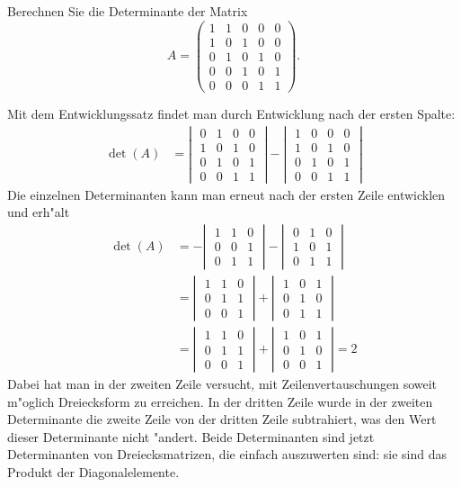 Berechnen Sie die Determinante der Matrix
\[
A=
\begin{pmatrix}
1&1&0&0&0\\
1&0&1&0&0\\
0&1&0&1&0\\
0&0&1&0&1\\
0&0&0&1&1
\end{pmatrix}.
\]

\begin{loesung}
Mit dem Entwicklungssatz findet man durch Entwicklung nach der
ersten Spalte:
\begin{align*}
\det(A)
&=
\left|\;
\begin{matrix}
0&1&0&0\\
1&0&1&0\\
0&1&0&1\\
0&0&1&1
\end{matrix}
\;\right|
-
\left|\;
\begin{matrix}
1&0&0&0\\
1&0&1&0\\
0&1&0&1\\
0&0&1&1
\end{matrix}
\;\right|
\end{align*}
Die einzelnen Determinanten kann man erneut nach der ersten Zeile
entwicklen und erh"alt
\begin{align*}
\det(A)
&=
-\left|\;
\begin{matrix}
1&1&0\\
0&0&1\\
0&1&1
\end{matrix}
\;\right|
-
\left|\;
\begin{matrix}
0&1&0\\
1&0&1\\
0&1&1
\end{matrix}
\;\right|
\\
&=
\left|\;
\begin{matrix}
1&1&0\\
0&1&1\\
0&0&1
\end{matrix}
\;\right|
+
\left|\;
\begin{matrix}
1&0&1\\
0&1&0\\
0&1&1
\end{matrix}
\;\right|
\\
&=
\left|\;
\begin{matrix}
1&1&0\\
0&1&1\\
0&0&1
\end{matrix}
\;\right|
+
\left|\;
\begin{matrix}
1&0&1\\
0&1&0\\
0&0&1
\end{matrix}
\;\right|
=2
\end{align*}
Dabei hat man in der zweiten Zeile versucht, mit Zeilenvertauschungen
soweit m"oglich Dreiecksform zu erreichen.
In der dritten Zeile wurde in der zweiten Determinante die
zweite Zeile von der dritten Zeile subtrahiert, was den Wert
dieser Determinante nicht "andert.
Beide Determinanten sind jetzt Determinanten von Dreiecksmatrizen,
die einfach auszuwerten sind: sie sind das Produkt der Diagonalelemente.


\end{loesung}
